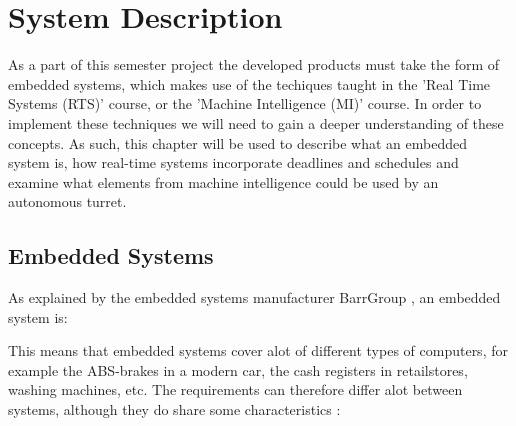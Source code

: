 \chapter{System Description}\label{SystemDescription}
As a part of this semester project the developed products must take the form of
embedded systems, which makes use of the techiques taught in the 'Real Time
Systems (RTS)' course, or the 'Machine Intelligence (MI)' course. In order to
implement these techniques we will need to gain a deeper understanding of these
concepts. As such, this chapter will be used to describe what an embedded system
is, how real-time systems incorporate deadlines and schedules and examine what
elements from machine intelligence could be used by an autonomous turret.

\section{Embedded Systems}
As explained by the embedded systems manufacturer BarrGroup
\citep{Barr_Embedded}, an embedded system is: \nl

\begin{center}
\begin{minipage}{0.8\linewidth}
\end{minipage}
\end{center}
% 

This means that embedded systems cover alot of different types of computers, for example
the ABS-brakes in a modern car, the cash registers in retailstores, washing machines, etc.
The requirements can therefore differ alot between systems, although they do
share some characteristics \citep[ch.1.1]{vahid1999embedded}:

